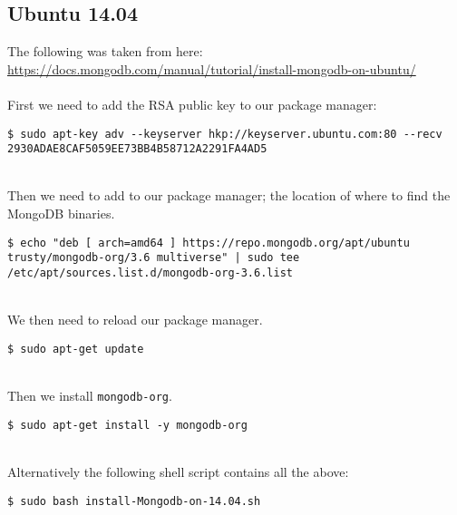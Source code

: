 \subsection{Ubuntu 14.04}\label{sec:14.04}
The following was taken from here:
\\
\url{https://docs.mongodb.com/manual/tutorial/install-mongodb-on-ubuntu/}
\\
\\
First we need to add the RSA public key to our package manager:
\begin{lstlisting}[backgroundcolor = \color{light-gray}]
$ sudo apt-key adv --keyserver hkp://keyserver.ubuntu.com:80 --recv 2930ADAE8CAF5059EE73BB4B58712A2291FA4AD5
\end{lstlisting}
~\\
Then we need to add to our package manager; the location of where to find the MongoDB binaries.
\begin{lstlisting}[backgroundcolor = \color{light-gray}]
$ echo "deb [ arch=amd64 ] https://repo.mongodb.org/apt/ubuntu trusty/mongodb-org/3.6 multiverse" | sudo tee /etc/apt/sources.list.d/mongodb-org-3.6.list
\end{lstlisting}
~\\
We then need to reload our package manager.
\begin{lstlisting}[backgroundcolor = \color{light-gray}]
$ sudo apt-get update
\end{lstlisting}
~\\
Then we install \texttt{mongodb-org}.
\begin{lstlisting}[backgroundcolor = \color{light-gray}]
$ sudo apt-get install -y mongodb-org
\end{lstlisting}
~\\
Alternatively the following shell script contains all the above:
\begin{lstlisting}[backgroundcolor = \color{light-gray}]
$ sudo bash install-Mongodb-on-14.04.sh
\end{lstlisting}
